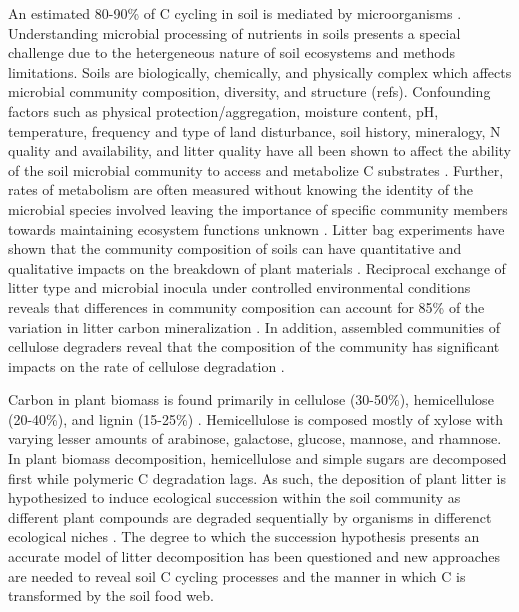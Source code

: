 An estimated 80-90\% of C cycling in soil is mediated by microorganisms \cite{ColemanCrossley_1996,Nannipieri_2003}. Understanding microbial processing of nutrients in soils presents a special challenge due to the hetergeneous nature of soil ecosystems and methods limitations. Soils are biologically, chemically, and physically complex which affects microbial community composition, diversity, and structure (refs). Confounding factors such as physical protection/aggregation, moisture content, pH, temperature, frequency and type of land disturbance, soil history, mineralogy, N quality and availability, and litter quality have all been shown to affect the ability of the soil microbial community to access and metabolize C substrates \cite{Sollins_Homann_Caldwell_1996}. Further, rates of metabolism are often measured without knowing the identity of the microbial species involved \cite{ndi_Pietramellara_Renella_2003} leaving the importance of specific community members towards maintaining ecosystem functions unknown \cite{Allison_2008,ndi_Pietramellara_Renella_2003,Schimel_2012}. Litter bag experiments have shown that the community composition of soils can have quantitative and qualitative impacts on the breakdown of plant materials \cite{Schimel_1995}. Reciprocal exchange of litter type and microbial inocula under controlled environmental conditions reveals that differences in community composition can account for 85\% of the variation in litter carbon mineralization \cite{Strickland_2009}. In addition, assembled communities of cellulose degraders reveal that the composition of the community has significant impacts on the rate of cellulose degradation \cite{Wohl_2004}. 

Carbon in plant biomass is found primarily in cellulose (30-50\%), hemicellulose (20-40\%), and lignin (15-25\%) \cite{Lynd_2002}. Hemicellulose is composed mostly of xylose with varying lesser amounts of arabinose, galactose, glucose, mannose, and rhamnose. In plant biomass decomposition, hemicellulose and simple sugars are decomposed first while polymeric C degradation lags. As such, the deposition of plant litter is hypothesized to induce ecological succession within the soil community as different plant compounds are degraded sequentially by organisms in differenct ecological niches \cite{Hu_1997,Rui_2009}. The degree to which the succession hypothesis presents an accurate model of litter decomposition has been questioned \cite{Kj_ller_1982,Frankland_1998,Osono_2005} and new approaches are needed to reveal soil C cycling processes and the manner in which C is transformed by the soil food web. 

